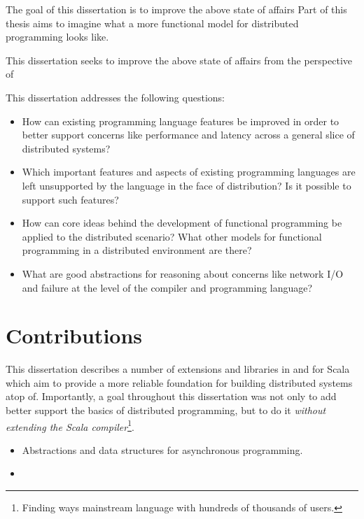 The goal of this dissertation is to improve the above state of affairs
Part of this thesis aims to imagine what a more functional model for distributed programming looks like.

This dissertation seeks to improve the above state of affairs from the
perspective of

This dissertation addresses the following questions:

\begin{itemize}

	\item How can existing programming language features be improved in order to
	better support concerns like performance and latency across a general slice of
	distributed systems?

	\item Which important features and aspects of existing programming languages
	are left unsupported by the language in the face of distribution? Is it
	possible to support such features?

	\item How can core ideas behind the development of functional programming be
	applied to the distributed scenario? What other models for functional
	programming in a distributed environment are there?

	\item What are good abstractions for reasoning about concerns like network I/O
	and failure at the level of the compiler and programming language?

\end{itemize}

\section{Contributions}

This dissertation describes a number of extensions and libraries in and for
Scala which aim to provide a more reliable foundation for building distributed
systems atop of. Importantly, a goal throughout this dissertation was not only
to add better support the basics of distributed programming, but to do it {\em
without extending the Scala compiler}\footnote{Finding ways mainstream language with
hundreds of thousands of users.}.

\begin{itemize}

	\item Abstractions and data structures for asynchronous programming.

	\item

\end{itemize}

